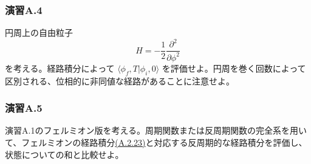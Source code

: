 \subsubsection*{演習A.4}\label{ex:A.4}
円周上の自由粒子
\[
H=-\frac12\frac{\partial^2}{\partial\phi^2}
\]
を考える。経路積分によって $\langle\phi_f,T|\phi_i,0\rangle$ を評価せよ。円周を巻く回数によって区別される、位相的に非同値な経路があることに注意せよ。

\subsubsection*{演習A.5}\label{ex:A.5}
演習A.1のフェルミオン版を考える。周期関数または反周期関数の完全系を用いて、フェルミオンの経路積分\hyperref[eq:A.2.23]{(A.2.23)}と対応する反周期的な経路積分を評価し、状態についての和と比較せよ。

